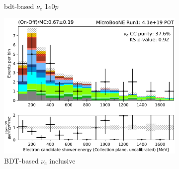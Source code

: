 \begin{figure}[ht]
\begin{center}
\begin{subfigure}[b]{0.28\textwidth}
    \caption{\label{fig:intro:nueselections:1e0p} bdt-based $\nu_e$ 1$e$0$p$}
    \end{subfigure}
    \begin{subfigure}[b]{0.31\textwidth}
    \centering
    \includegraphics[width=1.00\textwidth]{introduction/nueinclusive.png}
    \caption{\label{fig:intro:nueselections:inclusive} BDT-based $\nu_e$ inclusive}
    \end{subfigure}
\caption{\label{fig:intro:nueselections} }
\end{center}
\end{figure}


